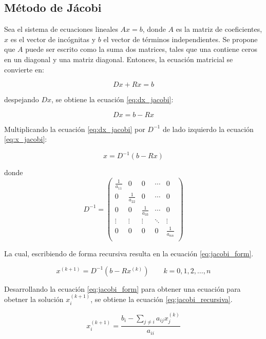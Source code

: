 \subsection{Método de Jácobi}

Sea el sistema de ecuaciones lineales $Ax=b$, donde $A$ es la matriz de coeficientes, $x$ es el vector de incógnitas y $b$ el vector de términos independientes. Se propone que $A$ puede ser escrito como la suma dos matrices, tales que una contiene ceros en un diagonal y una matriz diagonal. Entonces, la ecuación matricial se convierte en:

\begin{equation*}
    Dx+Rx = b
\end{equation*}

despejando $Dx$, se obtiene la ecuación \ref{eq:dx_jacobi}:

\begin{equation}
    Dx = b-Rx \label{eq:dx_jacobi}
\end{equation}

Multiplicando la ecuación \ref{eq:dx_jacobi} por $D^{-1}$ de lado izquierdo la ecuación \ref{eq:x_jacobi}:

\begin{equation}
    x= D^{-1}(b-Rx) \label{eq:x_jacobi}
\end{equation}

donde
\begin{equation*}
    D^{-1} =
    \begin{pmatrix}
        \frac{1}{a_{11}} & 0                & 0                & \cdots & 0                \\
        0                & \frac{1}{a_{22}} & 0                & \cdots & 0                \\
        0                & 0                & \frac{1}{a_{33}} & \cdots & 0                \\
        \vdots           & \vdots           & \vdots           & \ddots & \vdots           \\
        0                & 0                & 0                & 0      & \frac{1}{a_{nn}} \\
    \end{pmatrix}
\end{equation*}

La cual, escribiendo de forma recursiva resulta en la ecuación \ref{eq:jacobi_form}.

\begin{equation}
    x^{(k+1)}=D^{-1} (b-Rx^{(k)}) \qquad k=0,1,2,\dots,n \label{eq:jacobi_form}
\end{equation}


Desarrollando la ecuación \ref{eq:jacobi_form} para obtener una ecuación para obetner la solución $x_i^{(k+1)}$, se obtiene la ecuación \ref{eq:jacobi_recursiva}.

\begin{equation}
    x_i^{(k+1)} = \frac{b_i - \sum\limits_{j\neq i} a_{ij}x_{j}^{(k)}}{a_{ii}} \label{eq:jacobi_recursiva}
\end{equation}